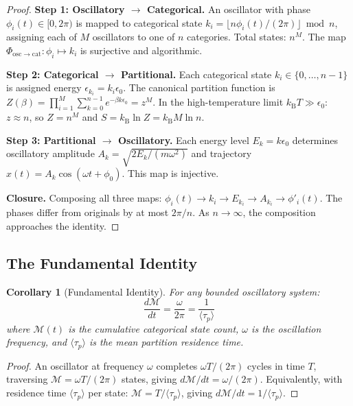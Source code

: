 \documentclass[11pt,twocolumn,a4paper]{article}
\newtheorem{corollary}[theorem]{Corollary}
\theoremstyle{definition}
\theoremstyle{remark}
\newcommand{\kB}{k_{\mathrm{B}}}
\newcommand{\Depth}{\mathcal{M}}
\newcommand{\taup}{\tau_p}
\begin{document}
\begin{proof}
\textbf{Step 1: Oscillatory $\to$ Categorical.} An oscillator with phase $\phi_i(t) \in [0, 2\pi)$ is mapped to categorical state $k_i = \lfloor n \phi_i(t) / (2\pi) \rfloor \bmod n$, assigning each of $M$ oscillators to one of $n$ categories. Total states: $n^M$. The map $\Phi_{\mathrm{osc} \to \mathrm{cat}}: \phi_i \mapsto k_i$ is surjective and algorithmic.

\textbf{Step 2: Categorical $\to$ Partitional.} Each categorical state $k_i \in \{0, \ldots, n-1\}$ is assigned energy $\epsilon_{k_i} = k_i \epsilon_0$. The canonical partition function is $Z(\beta) = \prod_{i=1}^{M} \sum_{k=0}^{n-1} e^{-\beta k \epsilon_0} = z^M$. In the high-temperature limit $\kB T \gg \epsilon_0$: $z \approx n$, so $Z = n^M$ and $S = \kB \ln Z = \kB M \ln n$.

\textbf{Step 3: Partitional $\to$ Oscillatory.} Each energy level $E_k = k\epsilon_0$ determines oscillatory amplitude $A_k = \sqrt{2E_k/(m\omega^2)}$ and trajectory $x(t) = A_k \cos(\omega t + \phi_0)$. This map is injective.

\textbf{Closure.} Composing all three maps: $\phi_i(t) \to k_i \to E_{k_i} \to A_{k_i} \to \phi'_i(t)$. The phases differ from originals by at most $2\pi/n$. As $n \to \infty$, the composition approaches the identity.
\end{proof}

\subsection{The Fundamental Identity}

\begin{corollary}[Fundamental Identity]
\label{cor:fundamental}
For any bounded oscillatory system:
\begin{equation}
\boxed{\frac{d\Depth}{dt} = \frac{\omega}{2\pi} = \frac{1}{\langle\taup\rangle}}
\label{eq:fundamental}
\end{equation}
where $\Depth(t)$ is the cumulative categorical state count, $\omega$ is the oscillation frequency, and $\langle\taup\rangle$ is the mean partition residence time.
\end{corollary}

\begin{proof}
An oscillator at frequency $\omega$ completes $\omega T/(2\pi)$ cycles in time $T$, traversing $\Depth = \omega T/(2\pi)$ states, giving $d\Depth/dt = \omega/(2\pi)$. Equivalently, with residence time $\langle\taup\rangle$ per state: $\Depth = T/\langle\taup\rangle$, giving $d\Depth/dt = 1/\langle\taup\rangle$.
\end{proof}
\end{document}
